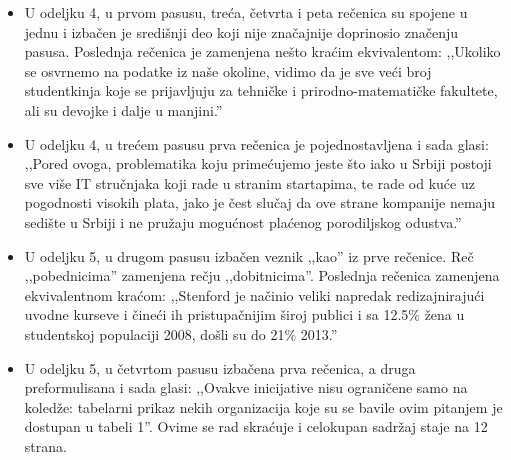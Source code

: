 \documentclass[a4paper]{report}
\begin{document}
{\begin{itemize}
\item U odeljku 4, u prvom pasusu, treća, četvrta i peta rečenica su spojene u jednu i izbačen je središnji deo koji nije značajnije doprinosio značenju pasusa. Poslednja rečenica je zamenjena nešto kraćim ekvivalentom: ,,Ukoliko se osvrnemo na podatke iz naše okoline, vidimo da je sve veći broj studentkinja koje se prijavljuju za tehničke i prirodno-matematičke fakultete, ali su devojke i dalje u manjini.''
\item U odeljku 4, u trećem pasusu prva rečenica je pojednostavljena i sada glasi: ,,Pored ovoga, problematika koju primećujemo jeste što iako u Srbiji postoji sve više IT stručnjaka koji rade u stranim startapima, te rade od kuće uz pogodnosti visokih plata, jako je čest slučaj da ove strane kompanije nemaju sedište u Srbiji i ne pružaju mogućnost plaćenog porodiljskog odustva.''
\item U odeljku 5, u drugom pasusu izbačen veznik ,,kao'' iz prve rečenice. Reč ,,pobednicima'' zamenjena rečju ,,dobitnicima''. Poslednja rečenica zamenjena ekvivalentnom kraćom: ,,Stenford je načinio veliki napredak redizajnirajući uvodne kurseve i čineći ih pristupačnijim široj publici i sa 12.5\% žena u studentskoj populaciji 2008, došli su do 21\% 2013.''
\item U odeljku 5, u četvrtom pasusu izbačena prva rečenica, a druga preformulisana i sada glasi: ,,Ovakve inicijative nisu ograničene samo na koledže: tabelarni prikaz nekih organizacija koje su se bavile ovim pitanjem je dostupan u tabeli 1''. Ovime se rad skraćuje i celokupan sadržaj staje na 12 strana.
\end{itemize}
}
\end{document}
